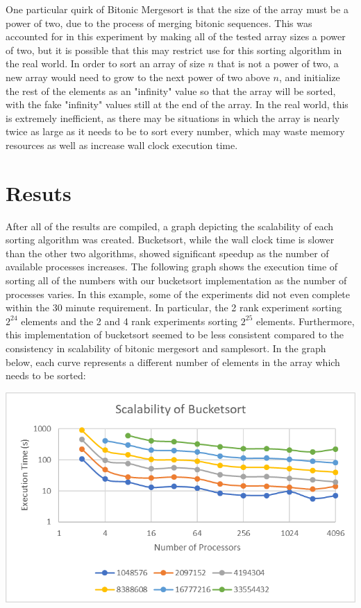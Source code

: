 \documentclass[10pt,letterpaper]{article}
\begin{document}
\begin{multicols}{2}
One particular quirk of Bitonic Mergesort is that the size of the array must be a power of two, due to the process of merging bitonic sequences. This was accounted for in this experiment by making all of the tested array sizes a power of two, but it is possible that this may restrict use for this sorting algorithm in the real world. In order to sort an array of size $n$ that is not a power of two, a new array would need to grow to the next power of two above $n$, and initialize the rest of the elements as an "infinity" value so that the array will be sorted, with the fake "infinity" values still at the end of the array. In the real world, this is extremely inefficient, as there may be situations in which the array is nearly twice as large as it needs to be to sort every number, which may waste memory resources as well as increase wall clock execution time.
\section{Resuts}
After all of the results are compiled, a graph depicting the scalability of each sorting algorithm was created. Bucketsort, while the wall clock time is slower than the other two algorithms, showed significant speedup as the number of available processes increases. The following graph shows the execution time of sorting all of the numbers with our bucketsort implementation as the number of processes varies. In this example, some of the experiments did not even complete within the 30 minute requirement. In particular, the 2 rank experiment sorting $2^{24}$ elements and the 2 and 4 rank experiments sorting $2^{25}$ elements. Furthermore, this implementation of bucketsort seemed to be less consistent compared to the consistency in scalability of bitonic mergesort and samplesort. In the graph below, each curve represents a different number of elements in the array which needs to be sorted:

\begin{center}
\includegraphics[scale=1.3]{bucket_scale}
\end{center}


\end{multicols}
\end{document}
